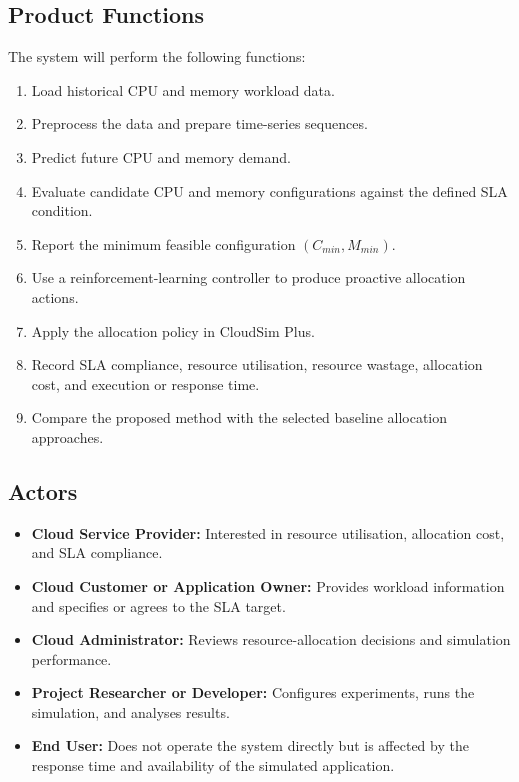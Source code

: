 \documentclass[12pt,a4paper]{report}
\begin{document}
\subsection{Product Functions}
The system will perform the following functions:
\begin{enumerate}
    \item Load historical CPU and memory workload data.
    \item Preprocess the data and prepare time-series sequences.
    \item Predict future CPU and memory demand.
    \item Evaluate candidate CPU and memory configurations against the defined SLA condition.
    \item Report the minimum feasible configuration $(C_{min},M_{min})$.
    \item Use a reinforcement-learning controller to produce proactive allocation actions.
    \item Apply the allocation policy in CloudSim Plus.
    \item Record SLA compliance, resource utilisation, resource wastage, allocation cost, and execution or response time.
    \item Compare the proposed method with the selected baseline allocation approaches.
\end{enumerate}
\lipsum[31-32]

\subsection{Actors}
\begin{itemize}
    \item \textbf{Cloud Service Provider:} Interested in resource utilisation, allocation cost, and SLA compliance.
    \item \textbf{Cloud Customer or Application Owner:} Provides workload information and specifies or agrees to the SLA target.
    \item \textbf{Cloud Administrator:} Reviews resource-allocation decisions and simulation performance.
    \item \textbf{Project Researcher or Developer:} Configures experiments, runs the simulation, and analyses results.
    \item \textbf{End User:} Does not operate the system directly but is affected by the response time and availability of the simulated application.
\end{itemize}
\lipsum[33]
\end{document}
